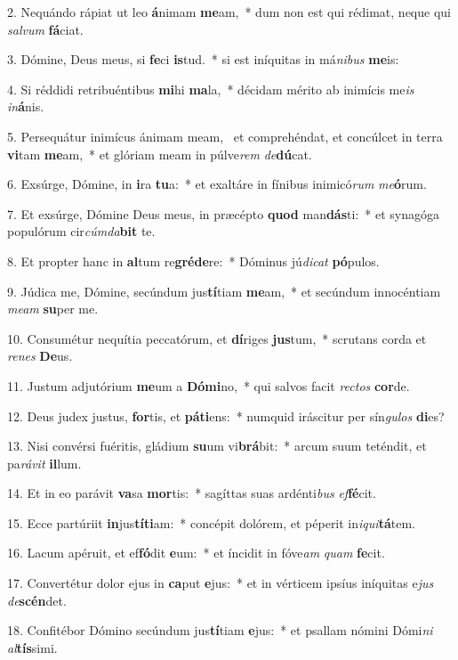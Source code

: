 2. Nequándo rápiat ut leo \textbf{á}nimam \textbf{me}am,~*  dum non est qui rédimat, neque qui \textit{sal}\textit{vum} \textbf{fá}ciat.\

3. Dómine, Deus meus, si \textbf{fe}ci \textbf{is}tud.~*  si est iníquitas in má\textit{ni}\textit{bus} \textbf{me}is:\

4. Si réddidi retribuéntibus \textbf{mi}hi \textbf{ma}la,~*  décidam mérito ab inimícis me\textit{is} \textit{in}\textbf{á}nis.\

5. Persequátur inimícus ánimam meam, \dag\  et comprehéndat, et concúlcet in terra \textbf{vi}tam \textbf{me}am,~*  et glóriam meam in púlve\textit{rem} \textit{de}\textbf{dú}cat.\

6. Exsúrge, Dómine, in \textbf{i}ra \textbf{tu}a:~*  et exaltáre in fínibus inimicó\textit{rum} \textit{me}\textbf{ó}rum.\

7. Et exsúrge, Dómine Deus meus, in præcépto \textbf{quod} man\textbf{dás}ti:~*  et synagóga populórum cir\textit{cúm}\textit{da}\textbf{bit} te.\

8. Et propter hanc in \textbf{al}tum re\textbf{gré}\textbf{de}re:~*  Dóminus jú\textit{di}\textit{cat} \textbf{pó}pulos.\

9. Júdica me, Dómine, secúndum jus\textbf{tí}tiam \textbf{me}am,~*  et secúndum innocéntiam \textit{me}\textit{am} \textbf{su}per me.\

10. Consumétur nequítia peccatórum, et \textbf{dí}riges \textbf{jus}tum,~*  scrutans corda et \textit{re}\textit{nes} \textbf{De}us.\

11. Justum adjutórium \textbf{me}um a \textbf{Dó}\textbf{mi}no,~*  qui salvos facit \textit{rec}\textit{tos} \textbf{cor}de.\

12. Deus judex justus, \textbf{for}tis, et \textbf{pá}\textbf{ti}ens:~*  numquid iráscitur per sín\textit{gu}\textit{los} \textbf{di}es?\

13. Nisi convérsi fuéritis, gládium \textbf{su}um vi\textbf{brá}bit:~*  arcum suum teténdit, et pa\textit{rá}\textit{vit} \textbf{il}lum.\

14. Et in eo parávit \textbf{va}sa \textbf{mor}tis:~*  sagíttas suas ardénti\textit{bus} \textit{ef}\textbf{fé}cit.\

15. Ecce partúriit \textbf{in}jus\textbf{tí}\textbf{ti}am:~*  concépit dolórem, et péperit in\textit{i}\textit{qui}\textbf{tá}tem.\

16. Lacum apéruit, et ef\textbf{fó}dit \textbf{e}um:~*  et íncidit in fóve\textit{am} \textit{quam} \textbf{fe}cit.\

17. Convertétur dolor ejus in \textbf{ca}put \textbf{e}jus:~*  et in vérticem ipsíus iníquitas e\textit{jus} \textit{de}\textbf{scén}det.\

18. Confitébor Dómino secúndum jus\textbf{tí}tiam \textbf{e}jus:~*  et psallam nómini Dómi\textit{ni} \textit{al}\textbf{tís}simi.\


